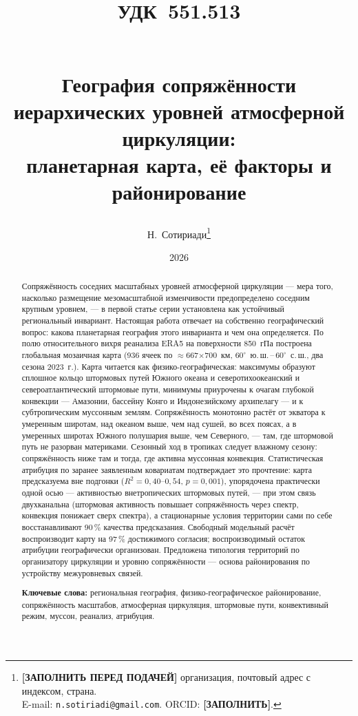 \documentclass[11pt,a4paper]{article}
\title{{\normalsize\normalfont\hspace*{-\leftskip}\parbox{\linewidth}{\raggedright УДК~551.513}}\\[1.5em]
География сопряжённости иерархических уровней атмосферной циркуляции:\\
планетарная карта, её факторы и районирование}
\author{Н.~Сотириади\thanks{%
  \textbf{[ЗАПОЛНИТЬ ПЕРЕД ПОДАЧЕЙ]} организация, почтовый адрес с индексом, страна.\\
  E-mail: \texttt{n.sotiriadi@gmail.com}. ORCID: \textbf{[ЗАПОЛНИТЬ]}.}}
\date{2026}
\begin{document}
\maketitle

\begin{abstract}
Сопряжённость соседних масштабных уровней атмосферной циркуляции --- мера того, насколько размещение мезомасштабной изменчивости предопределено соседним крупным уровнем, --- в первой статье серии установлена как устойчивый региональный инвариант. Настоящая работа отвечает на собственно географический вопрос: какова планетарная география этого инварианта и чем она определяется. По полю относительного вихря реанализа ERA5 на поверхности 850~гПа построена глобальная мозаичная карта (936 ячеек по $\approx$667$\times$700~км, $60^\circ$~ю.\,ш.\,--\,$60^\circ$~с.\,ш., два сезона 2023~г.). Карта читается как физико-географическая: максимумы образуют сплошное кольцо штормовых путей Южного океана и северотихоокеанский и североатлантический штормовые пути, минимумы приурочены к очагам глубокой конвекции --- Амазонии, бассейну Конго и Индонезийскому архипелагу --- и к субтропическим муссонным землям. Сопряжённость монотонно растёт от экватора к умеренным широтам, над океаном выше, чем над сушей, во всех поясах, а в умеренных широтах Южного полушария выше, чем Северного, --- там, где штормовой путь не разорван материками. Сезонный ход в тропиках следует влажному сезону: сопряжённость ниже там и тогда, где активна муссонная конвекция. Статистическая атрибуция по заранее заявленным ковариатам подтверждает это прочтение: карта предсказуема вне подгонки ($R^2=0{,}40$--$0{,}54$, $p=0{,}001$), упорядочена практически одной осью --- активностью внетропических штормовых путей, --- при этом связь двухканальна (штормовая активность повышает сопряжённость через спектр, конвекция понижает сверх спектра), а стационарные условия территории сами по себе восстанавливают 90\,\% качества предсказания. Свободный модельный расчёт воспроизводит карту на 97\,\% достижимого согласия; воспроизводимый остаток атрибуции географически организован. Предложена типология территорий по организатору циркуляции и уровню сопряжённости --- основа районирования по устройству межуровневых связей.

\smallskip
\noindent\textbf{Ключевые слова:} региональная география, физико-географическое районирование, сопряжённость масштабов, атмосферная циркуляция, штормовые пути, конвективный режим, муссон, реанализ, атрибуция.
\end{abstract}
\end{document}
